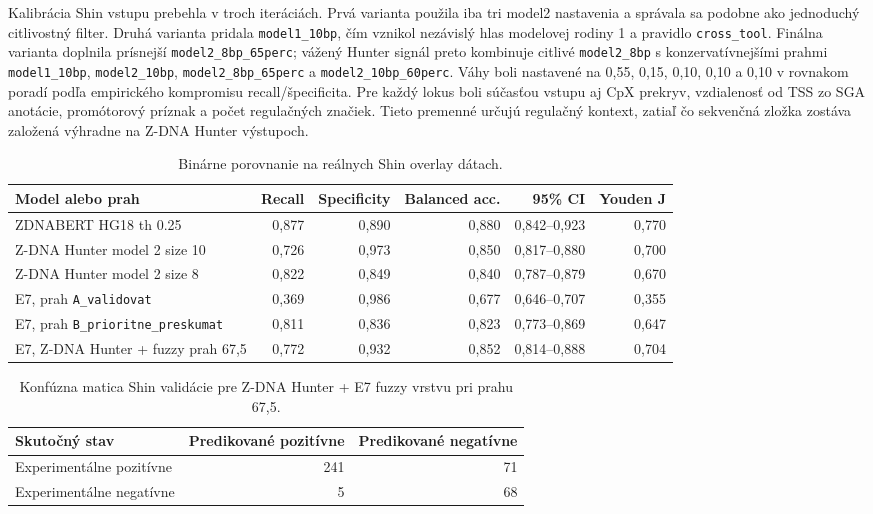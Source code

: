\documentclass[12pt,a4paper]{article}
\begin{document}
Kalibrácia Shin vstupu prebehla v troch iteráciách. Prvá varianta použila iba tri model2 nastavenia a správala sa podobne ako jednoduchý citlivostný filter. Druhá varianta pridala \texttt{model1\_10bp}, čím vznikol nezávislý hlas modelovej rodiny 1 a pravidlo \texttt{cross\_tool}. Finálna varianta doplnila prísnejší \texttt{model2\_8bp\_65perc}; vážený Hunter signál preto kombinuje citlivé \texttt{model2\_8bp} s konzervatívnejšími prahmi \texttt{model1\_10bp}, \texttt{model2\_10bp}, \texttt{model2\_8bp\_65perc} a \texttt{model2\_10bp\_60perc}. Váhy boli nastavené na 0,55, 0,15, 0,10, 0,10 a 0,10 v rovnakom poradí podľa empirického kompromisu recall/špecificita. Pre každý lokus boli súčasťou vstupu aj CpX prekryv, vzdialenosť od TSS zo SGA anotácie, promótorový príznak a počet regulačných značiek. Tieto premenné určujú regulačný kontext, zatiaľ čo sekvenčná zložka zostáva založená výhradne na Z-DNA Hunter výstupoch.

\begin{table}[htbp]
\centering
\caption{Binárne porovnanie na reálnych Shin overlay dátach.}
\footnotesize
\setlength{\tabcolsep}{4pt}
\begin{tabular}{>{\raggedright\arraybackslash}p{4.8cm}rrrrr}
\toprule
Model alebo prah & Recall & Specificity & Balanced acc. & 95\% CI & Youden J \\
\midrule
ZDNABERT HG18 th 0.25 & 0,877 & 0,890 & 0,880 & 0,842--0,923 & 0,770 \\
Z-DNA Hunter model 2 size 10 & 0,726 & 0,973 & 0,850 & 0,817--0,880 & 0,700 \\
Z-DNA Hunter model 2 size 8 & 0,822 & 0,849 & 0,840 & 0,787--0,879 & 0,670 \\
E7, prah \texttt{A\_validovat} & 0,369 & 0,986 & 0,677 & 0,646--0,707 & 0,355 \\
E7, prah \texttt{B\_prioritne\_preskumat} & 0,811 & 0,836 & 0,823 & 0,773--0,869 & 0,647 \\
E7, Z-DNA Hunter + fuzzy prah 67,5 & 0,772 & 0,932 & 0,852 & 0,814--0,888 & 0,704 \\
\bottomrule
\end{tabular}
\end{table}

\begin{table}[htbp]
\centering
\caption{Konfúzna matica Shin validácie pre Z-DNA Hunter + E7 fuzzy vrstvu pri prahu 67,5.}
\small
\begin{tabular}{lrr}
\toprule
Skutočný stav & Predikované pozitívne & Predikované negatívne \\
\midrule
Experimentálne pozitívne & 241 & 71 \\
Experimentálne negatívne & 5 & 68 \\
\bottomrule
\end{tabular}
\end{table}
\end{document}
